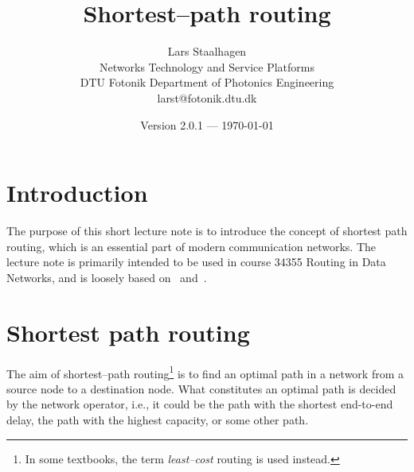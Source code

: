 \documentclass[a4paper]{article}
\begin{document}
\title{Shortest--path routing}
\author{Lars Staalhagen \\ Networks Technology and Service Platforms \\ DTU Fotonik Department of Photonics Engineering \\ larst@fotonik.dtu.dk}
\date{Version 2.0.1 --- \today}
\maketitle

\section{Introduction}
The purpose of this short lecture note is to introduce the concept of shortest path routing, which is an essential part of modern communication networks. The lecture note is primarily intended to be used in course 34355 Routing in Data Networks, and is loosely based on~\cite{ref:Bert} and~\cite{ref:Algo}.

\section{\label{sec:shortestpath}Shortest path routing}
The aim of shortest--path routing\footnote{In some textbooks, the term \emph{least--cost} routing is used instead.} is to find an optimal path in a network from a source node to a destination node. What constitutes an optimal path is decided by the network operator, i.e., it could be the path with the shortest end-to-end delay, the path with the highest capacity, or some other path.
\end{document}
